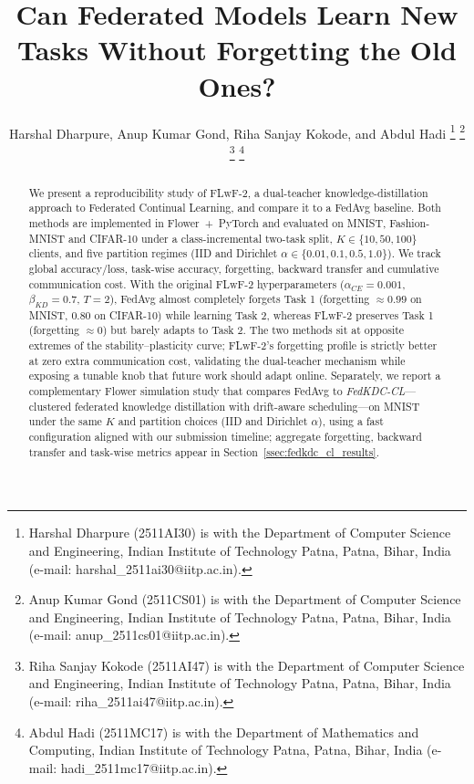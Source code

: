 \documentclass[journal]{IEEEtran}
\begin{document}
\title{Can Federated Models Learn New Tasks Without Forgetting the Old Ones?}



\author{
Harshal Dharpure,
Anup Kumar Gond,
Riha Sanjay Kokode,
and Abdul Hadi%
\thanks{
Harshal Dharpure (2511AI30) is with the Department of Computer Science and Engineering,
Indian Institute of Technology Patna, Patna, Bihar, India
(e-mail: harshal\_2511ai30@iitp.ac.in).
}%
\thanks{
Anup Kumar Gond (2511CS01) is with the Department of Computer Science and Engineering,
Indian Institute of Technology Patna, Patna, Bihar, India
(e-mail: anup\_2511cs01@iitp.ac.in).
}%
\thanks{
Riha Sanjay Kokode (2511AI47) is with the Department of Computer Science and Engineering,
Indian Institute of Technology Patna, Patna, Bihar, India
(e-mail: riha\_2511ai47@iitp.ac.in).
}%
\thanks{
Abdul Hadi (2511MC17) is with the Department of Mathematics and Computing,
Indian Institute of Technology Patna, Patna, Bihar, India
(e-mail: hadi\_2511mc17@iitp.ac.in).
}
}

\maketitle

\begin{abstract}
We present a reproducibility study of FLwF-2, a dual-teacher
knowledge-distillation approach to Federated Continual Learning, and
compare it to a FedAvg baseline. Both methods are implemented in
Flower~+~PyTorch and evaluated on MNIST, Fashion-MNIST and CIFAR-10
under a class-incremental two-task split, $K{\in}\{10,50,100\}$
clients, and five partition regimes (IID and Dirichlet
$\alpha{\in}\{0.01,0.1,0.5,1.0\}$). We track global accuracy/loss,
task-wise accuracy, forgetting, backward transfer and cumulative
communication cost. With the original FLwF-2 hyperparameters
($\alpha_{CE}{=}0.001$, $\beta_{KD}{=}0.7$, $T{=}2$), FedAvg almost
completely forgets Task 1 (forgetting $\approx 0.99$ on MNIST,
$0.80$ on CIFAR-10) while learning Task 2, whereas FLwF-2 preserves
Task 1 (forgetting $\approx 0$) but barely adapts to Task 2. The two
methods sit at opposite extremes of the stability--plasticity curve;
FLwF-2's forgetting profile is strictly better at zero extra
communication cost, validating the dual-teacher mechanism while
exposing a tunable knob that future work should adapt online.
Separately, we report a complementary Flower simulation study that
compares FedAvg to \emph{FedKDC-CL}---clustered federated knowledge
distillation with drift-aware scheduling---on MNIST under the same
$K$ and partition choices (IID and Dirichlet $\alpha$), using a fast
configuration aligned with our submission timeline; aggregate forgetting,
backward transfer and task-wise metrics appear in
Section~\ref{ssec:fedkdc_cl_results}.
\end{abstract}
\end{document}
